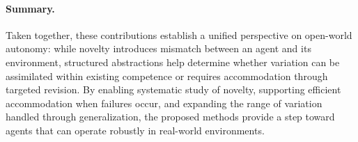\paragraph{Summary.}
Taken together, these contributions establish a unified perspective on open-world autonomy: while novelty introduces mismatch between an agent and its environment, structured abstractions help determine whether variation can be assimilated within existing competence or requires accommodation through targeted revision. By enabling systematic study of novelty, supporting efficient accommodation when failures occur, and expanding the range of variation handled through generalization, the proposed methods provide a step toward agents that can operate robustly in real-world environments.

